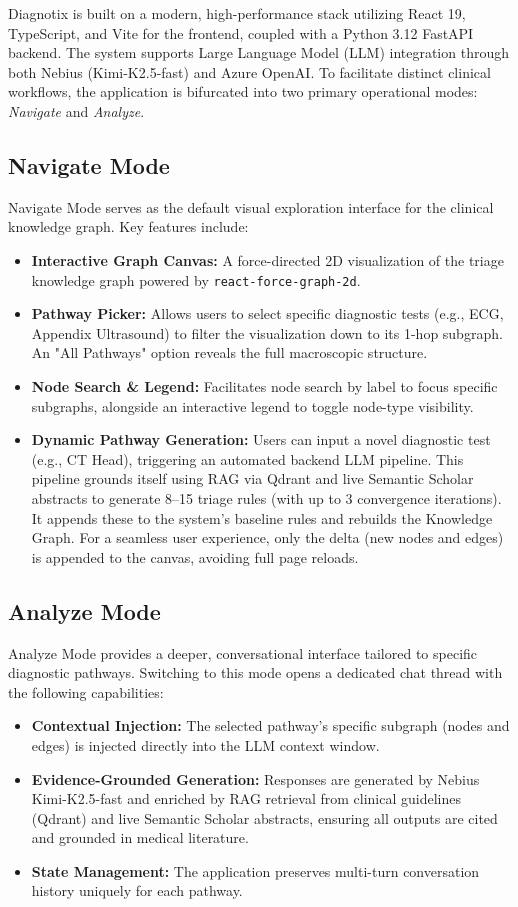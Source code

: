 \documentclass[pmlr]{jmlr}%
\begin{document}
Diagnotix is built on a modern, high-performance stack utilizing React 19, TypeScript, and Vite for the frontend, coupled with a Python 3.12 FastAPI backend. The system supports Large Language Model (LLM) integration through both Nebius (Kimi-K2.5-fast) and Azure OpenAI. To facilitate distinct clinical workflows, the application is bifurcated into two primary operational modes: \textit{Navigate} and \textit{Analyze}.

\subsection{Navigate Mode}
Navigate Mode serves as the default visual exploration interface for the clinical knowledge graph. Key features include:
\begin{itemize}
    \item \textbf{Interactive Graph Canvas:} A force-directed 2D visualization of the triage knowledge graph powered by \texttt{react-force-graph-2d}.
    \item \textbf{Pathway Picker:} Allows users to select specific diagnostic tests (e.g., ECG, Appendix Ultrasound) to filter the visualization down to its 1-hop subgraph. An "All Pathways" option reveals the full macroscopic structure.
    \item \textbf{Node Search \& Legend:} Facilitates node search by label to focus specific subgraphs, alongside an interactive legend to toggle node-type visibility.
    \item \textbf{Dynamic Pathway Generation:} Users can input a novel diagnostic test (e.g., CT Head), triggering an automated backend LLM pipeline. This pipeline grounds itself using RAG via Qdrant and live Semantic Scholar abstracts to generate 8--15 triage rules (with up to 3 convergence iterations). It appends these to the system's baseline rules and rebuilds the Knowledge Graph. For a seamless user experience, only the delta (new nodes and edges) is appended to the canvas, avoiding full page reloads.
\end{itemize}

\subsection{Analyze Mode}
Analyze Mode provides a deeper, conversational interface tailored to specific diagnostic pathways. Switching to this mode opens a dedicated chat thread with the following capabilities:
\begin{itemize}
    \item \textbf{Contextual Injection:} The selected pathway's specific subgraph (nodes and edges) is injected directly into the LLM context window.
    \item \textbf{Evidence-Grounded Generation:} Responses are generated by Nebius Kimi-K2.5-fast and enriched by RAG retrieval from clinical guidelines (Qdrant) and live Semantic Scholar abstracts, ensuring all outputs are cited and grounded in medical literature.
    \item \textbf{State Management:} The application preserves multi-turn conversation history uniquely for each pathway.
\end{itemize}
\end{document}
